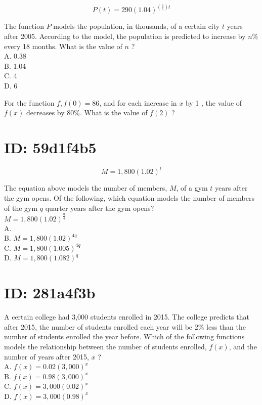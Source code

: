 $$
P(t)=290(1.04)^{\left(\frac{4}{6}\right) t}
$$

The function $P$ models the population, in thousands, of a certain city $t$ years after 2005. According to the model, the population is predicted to increase by $n \%$ every 18 months. What is the value of $n$ ?\\
A. 0.38\\
B. 1.04\\
C. 4\\
D. 6

For the function $f, f(0)=86$, and for each increase in $x$ by 1 , the value of $f(x)$ decreases by $80 \%$. What is the value of $f(2)$ ?

\section*{ID: 59d1f4b5}
$$
M=1,800(1.02)^{t}
$$

The equation above models the number of members, $M$, of a gym $t$ years after the gym opens. Of the following, which equation models the number of members of the gym $q$ quarter years after the gym opens?\\
$M=1,800(1.02)^{\frac{q}{4}}$\\
A.\\
B. $M=1,800(1.02)^{4 q}$\\
C. $M=1,800(1.005)^{4 q}$\\
D. $M=1,800(1.082)^{q}$

\section*{ID: 281a4f3b}
A certain college had 3,000 students enrolled in 2015. The college predicts that after 2015, the number of students enrolled each year will be $2 \%$ less than the number of students enrolled the year before. Which of the following functions models the relationship between the number of students enrolled, $f(x)$, and the number of years after 2015, $x$ ?\\
A. $f(x)=0.02(3,000)^{x}$\\
B. $f(x)=0.98(3,000)^{x}$\\
C. $f(x)=3,000(0.02)^{x}$\\
D. $f(x)=3,000(0.98)^{x}$

